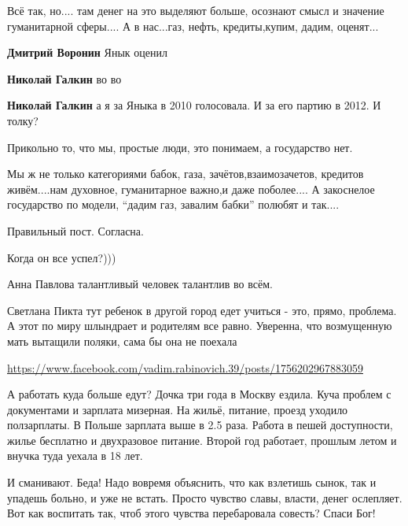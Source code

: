 \begin{itemize}


Всё так, но.... там денег на это выделяют больше, осознают смысл и значение
гуманитарной сферы....  А в нас...газ, нефть, кредиты,купим, дадим, оценят...


\textbf{Дмитрий Воронин} Янык оценил


\textbf{Николай Галкин} во во


\textbf{Николай Галкин} а я за Яныка в 2010 голосовала. И за его партию в 2012. И толку?


Прикольно то, что мы, простые люди, это понимаем, а государство нет.


Мы ж не только категориями бабок, газа, зачётов,взаимозачетов, кредитов
живём....нам духовное, гуманитарное важно,и даже поболее....  А закоснелое
государство по модели, \enquote{дадим газ, завалим бабки} полюбят и так....


Правильный пост. Согласна.


Когда он все успел?)))


Анна Павлова талантливый человек талантлив во всём.


Светлана Пикта тут ребенок в другой город едет учиться - это, прямо, проблема.
А этот по миру шлындрает и родителям все равно. Уверенна, что возмущенную мать
вытащили поляки, сама бы она не поехала


\url{https://www.facebook.com/vadim.rabinovich.39/posts/1756202967883059}


А работать куда больше едут?  Дочка три года в Москву ездила. Куча проблем с
документами и зарплата мизерная.  На жильё, питание, проезд уходило
ползарплаты.  В Польше зарплата выше в 2.5 раза. Работа в пешей доступности,
жилье бесплатно и двухразовое питание.  Второй год работает, прошлым летом и
внучка туда уехала в 18 лет.


И сманивают. Беда! Надо вовремя объяснить, что как взлетишь сынок, так и
упадешь больно, и уже не встать. Просто чувство славы, власти, денег ослепляет.
Вот как воспитать так, чтоб этого чувства перебаровала совесть? Спаси Бог!

\end{itemize}
